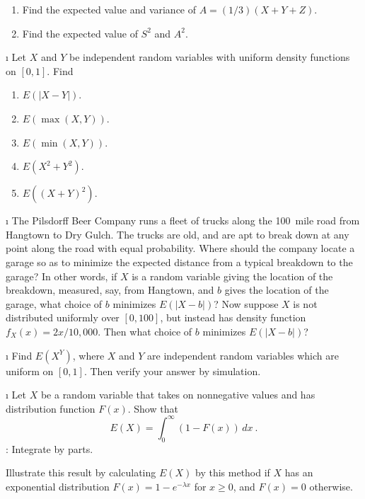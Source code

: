 {\begin{LJSItem}
\begin{enumerate}
\item Find the expected value and variance of $A = (1/3)(X + Y + Z)$.

\item Find the expected value of $S^2$ and $A^2$.
\end{enumerate}

\i\label{exer 6.3.12} Let $X$ and $Y$ be independent random variables with uniform
density functions on $[0,1]$.  Find

\begin{enumerate}
\item $E(|X - Y|)$.

\item $E(\max(X,Y))$.

\item $E(\min(X,Y))$.

\item $E(X^2 + Y^2)$.

\item $E((X + Y)^2)$.
\end{enumerate}

\i\label{exer 6.3.13} The Pilsdorff Beer Company runs a fleet of
trucks along the 100~mile road from Hangtown to Dry Gulch.  The
trucks are old, and are apt to break down at any point along the road with equal probability.  Where
should the company locate a garage so as to minimize the expected distance from a typical breakdown
to the garage?  In other words, if $X$ is a random variable giving the location of the
breakdown, measured, say, from Hangtown, and $b$ gives the location of the garage,
what choice of $b$ minimizes $E(|X - b|)$?  Now suppose
$X$ is not distributed uniformly over $[0,100]$, but instead has density function
$f_X(x) = 2x/10{,}000$.  Then what choice of $b$ minimizes $E(|X - b|)$?

\i\label{exer 6.3.14} Find $E(X^Y)$, where $X$ and $Y$ are independent random
variables which are uniform on $[0, 1]$.  Then verify your answer by simulation.

\i\label{exer 6.3.15} Let $X$ be a random variable that takes on nonnegative
values and has distribution function $F(x)$.  Show that
$$ E(X) = \int_0^\infty (1 - F(x))\, dx\ .
$$ 
 : Integrate by parts.

Illustrate this result by calculating $E(X)$ by this method if $X$ has an exponential
distribution $F(x) = 1 - e^{-\lambda x}$ for $x \geq 0$, and $F(x) = 0$ otherwise.


\end{LJSItem}}
